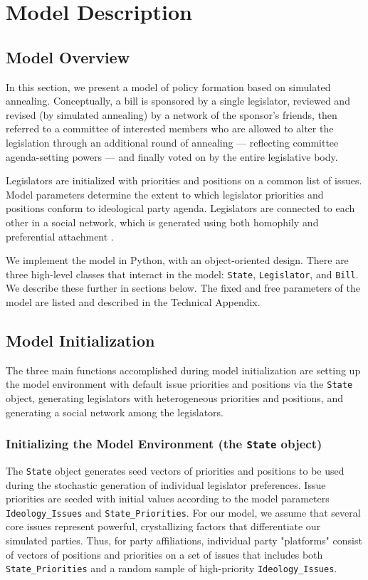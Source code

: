 \documentclass[pdftex,12pt]{llncs}
\begin{document}
\section{Model Description}

\subsection{Model Overview}
In this section, we present a model of policy formation based on simulated annealing.  Conceptually, a bill is sponsored by a single legislator, reviewed and revised (by simulated annealing) by a network of the sponsor's friends, then referred to a committee of interested members who are allowed to alter the legislation through an additional round of annealing --- reflecting committee agenda-setting powers \parencite{cm93, cm05} --- and finally voted on by the entire legislative body.

Legislators are initialized with priorities and positions on a common list of issues. Model parameters determine the extent to which legislator priorities and positions conform to ideological party agenda.  Legislators are connected to each other in a social network, which is generated using both homophily \parencite{msc01, br11} and preferential attachment \parencite{Barabasi1999}.

We implement the model in Python, with an object-oriented design. 
There are three high-level classes that interact in the model: \texttt{State}, \texttt{Legislator}, and \texttt{Bill}.  
We describe these further in sections below.
The fixed and free parameters of the model are listed and described in the Technical Appendix.

\subsection{Model Initialization} 
The three main functions accomplished during model initialization are setting up the model environment with default issue priorities and positions via the \texttt{State} object, generating legislators with heterogeneous priorities and positions, and generating a social network among the legislators.

\subsubsection{Initializing the Model Environment (the \texttt{State} object)}
The \texttt{State} object generates seed vectors of priorities and positions to be used during the stochastic generation of individual legislator preferences.  Issue priorities are seeded with initial values according to the model parameters \texttt{Ideology\_Issues} and \texttt{State\_Priorities}.  For our model, we assume that several core issues represent powerful, crystallizing factors that differentiate our simulated parties.  Thus, for party affiliations, individual party "platforms" consist of vectors of positions and priorities on a set of issues that includes both \texttt{State\_Priorities} and a random sample of high-priority \texttt{Ideology\_Issues}.
\end{document}
